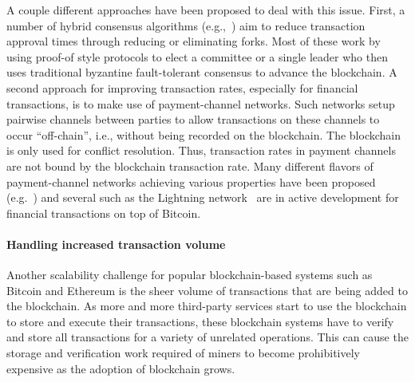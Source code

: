 A couple different approaches have been proposed to deal with this issue.  First, a number of hybrid consensus algorithms (e.g.,~\cite{SOSP:GHMVZ17,OPODIS:AMNRS17,DISC:PasShi17,EC:PasShi18,NSDI:EGSR16}) aim to reduce transaction approval times through reducing or eliminating forks.  Most of these work by using proof-of style protocols to elect a committee or a single leader who then uses traditional byzantine fault-tolerant consensus to advance the blockchain.  A second approach for improving transaction rates, especially for financial transactions, is to make use of payment-channel networks.  Such networks setup pairwise channels between parties to allow transactions on these channels to occur ``off-chain'', i.e., without being recorded on the blockchain.  The blockchain is only used for conflict resolution.  Thus, transaction rates in payment channels are not bound by the blockchain transaction rate.  Many different flavors of payment-channel networks achieving various properties have been proposed (e.g.~\cite{PooDry16, NDSS:HABSG17,CCS:KhaGer17,SYSTOR:LNEKPS18,CCS:MMKMR17,CCS:GreMie17}) and several such as the Lightning network~\cite{PooDry16} are in active development for financial transactions on top of Bitcoin.  

\paragraph{Handling increased transaction volume}
Another scalability challenge for popular blockchain-based systems such as Bitcoin and Ethereum is the sheer volume of transactions that are being added to the blockchain.  As more and more third-party services start to use the blockchain to store and execute their transactions, these blockchain systems have to verify and store all transactions for a variety of unrelated operations.  This can cause the storage and verification work required of miners to become prohibitively expensive as the adoption of blockchain grows.

